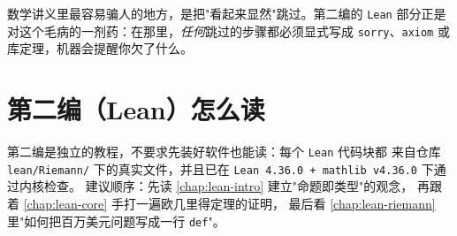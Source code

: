\begin{warnbox}[一个诚实的原则]
数学讲义里最容易骗人的地方，是把"看起来显然"跳过。第二编的 \texttt{Lean}
部分正是对这个毛病的一剂药：在那里，\emph{任何}跳过的步骤都必须显式写成
\texttt{sorry}、\texttt{axiom} 或库定理，机器会提醒你欠了什么。
\end{warnbox}

\section{第二编（Lean）怎么读}
\label{sec:00-lean}

第二编是独立的教程，不要求先装好软件也能读：每个 \texttt{Lean} 代码块都
来自仓库 \texttt{lean/Riemann/} 下的真实文件，并且已在
\texttt{Lean 4.36.0 + mathlib v4.36.0} 下通过内核检查。
建议顺序：先读 \cref{chap:lean-intro} 建立"命题即类型"的观念，
再跟着 \cref{chap:lean-core} 手打一遍欧几里得定理的证明，
最后看 \cref{chap:lean-riemann} 里"如何把百万美元问题写成一行 \texttt{def}"。
